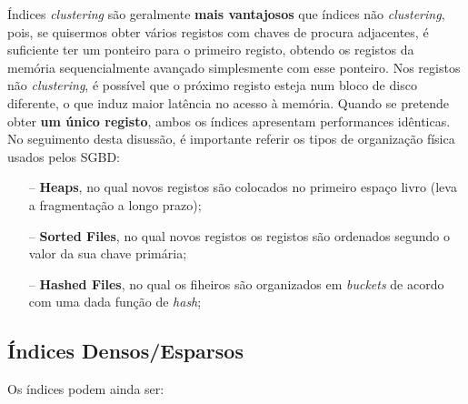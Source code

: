\documentclass[oneside]{book}
\theoremstyle{definition}
\begin{document}
Índices \textit{clustering} são geralmente \textbf{mais vantajosos} que índices não \textit{clustering}, pois, se quisermos obter vários registos com chaves de procura adjacentes, é suficiente ter um ponteiro para o primeiro registo, obtendo os registos da memória sequencialmente avançado simplesmente com esse ponteiro. Nos registos não \textit{clustering}, é possível que o próximo registo esteja num bloco de disco diferente, o que induz maior latência no acesso à memória. Quando se pretende obter \textbf{um único registo}, ambos os índices apresentam performances idênticas. \\

No seguimento desta disussão, é importante referir os tipos de organização física usados pelos SGBD:
\begin{itemize}
    \itemsep0cm
    \item[--]\textbf{Heaps}, no qual novos registos são colocados no primeiro espaço livro (leva a fragmentação a longo prazo);
    \item[--]\textbf{Sorted Files}, no qual novos registos os registos são ordenados segundo o valor da sua chave primária;
    \item[--] \textbf{Hashed Files}, no qual os fiheiros são organizados em \textit{buckets} de acordo com uma dada função de \textit{hash};
\end{itemize}

\subsection{Índices Densos/Esparsos}

Os índices podem ainda ser:
\end{document}
